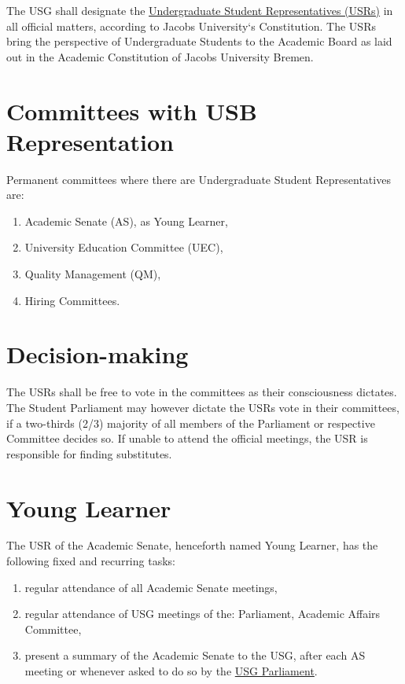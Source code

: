 \documentclass[12pt]{LaTeX_Misc/constitution}
\begin{document}

The USG shall designate the \hyperref[USRdef]{Undergraduate Student Representatives (USRs)} in all official matters, according to Jacobs University`s Constitution. The USRs bring the perspective of Undergraduate Students to the Academic Board as laid out in the Academic Constitution of Jacobs University Bremen. 

\section{Committees with USB Representation}
Permanent committees where there are Undergraduate Student Representatives are:
\begin{enumerate}
\item Academic Senate (AS), as Young Learner,
\item University Education Committee (UEC),
\item Quality Management (QM),
\item Hiring Committees.
\end{enumerate}

\section{Decision-making}
The USRs shall be free to vote in the committees as their consciousness dictates. The Student Parliament may however  dictate the USRs vote in their committees, if a two-thirds (2/3) majority of all members of the Parliament or respective Committee decides so. If unable to attend the official meetings, the USR is responsible for finding substitutes.

\section{Young Learner}
The USR of the Academic Senate, henceforth named Young Learner, has the following fixed and recurring tasks: 
\begin{enumerate}
\item
regular attendance of all Academic Senate meetings,

\item
regular attendance of USG meetings of the: Parliament, Academic Affairs Committee,

\item
present a summary of the Academic Senate to the USG, after each AS meeting or whenever asked to do so by the \hyperref[USGParliamentDef]{USG Parliament}.
\end{enumerate}
\end{document}

